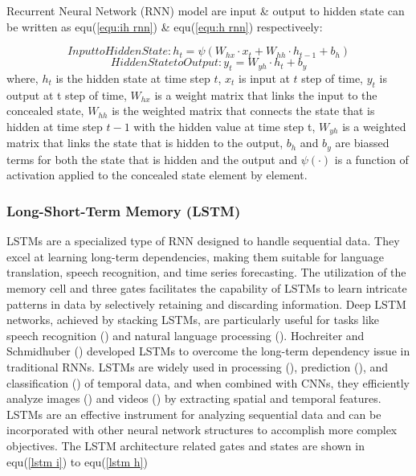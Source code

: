 \documentclass[a4paper,fleqn]{cas-sc}
\begin{document}
Recurrent Neural Network (RNN) model are input \& output to hidden state can be written as equ(\ref{equ:ih rnn}) \& equ(\ref{equ:h rnn}) respectiveely:

  \begin{equation} \label{equ:ih rnn}
    Input to Hidden State: h_t= \psi (W_{hx} \cdot x_t + W_{hh} \cdot h_{t-1} +b_h)
  \end{equation}
  \begin{equation} \label{equ:h rnn}
    Hidden State to Output: y_t=W_{yh}\cdot h_t+b_y
  \end{equation}
where, $h_t $ is the hidden state at time step $t$, $x_t$ is input at $t$ step of time, $y_t$ is output at t step of time, $W_{hx} $ is a weight matrix that links the input to the concealed state, $W_{hh}$ is the weighted matrix that connects the state that is hidden at time step $t-1$ with the hidden value at time step t, $W_{yh}$ is a weighted matrix that links the state that is hidden to the output, $b_h$ and $b_y$ are biassed terms for both the state that is hidden and the output and $\psi (\cdot)$ is a function of activation applied to the concealed state element by element.


\subsubsection{Long-Short-Term Memory (LSTM)}
LSTMs are a specialized type of RNN designed to handle sequential data. They excel at learning long-term dependencies, making them suitable for language translation, speech recognition, and time series forecasting. The utilization of the memory cell and three gates facilitates the capability of LSTMs to learn intricate patterns in data by selectively retaining and discarding information. Deep LSTM networks, achieved by stacking LSTMs, are particularly useful for tasks like speech recognition (\cite{soltau2016neural,jo2020approximate}) and natural language processing (\cite{wang2015learning,nammous2019natural}). Hochreiter and Schmidhuber  (\cite{hochreiter1997long}) developed LSTMs to overcome the long-term dependency issue in traditional RNNs. LSTMs are widely used in processing (\cite{sahin2018nonuniformly}), prediction (\cite{gers2000learning}), and classification (\cite{zhou2015c,karim2017lstm}) of temporal data, and when combined with CNNs, they efficiently analyze images (\cite{li2019cnn,rajendran2020land,islam2020combined}) and videos (\cite{ullah2017action,li2020classifying,gao2017video,bin2018describing}) by extracting spatial and temporal features. LSTMs are an effective instrument for analyzing sequential data and can be incorporated with other neural network structures to accomplish more complex objectives.
The LSTM architecture related gates and states are shown in equ(\ref{lstm i}) to equ(\ref{lstm h})
\end{document}
